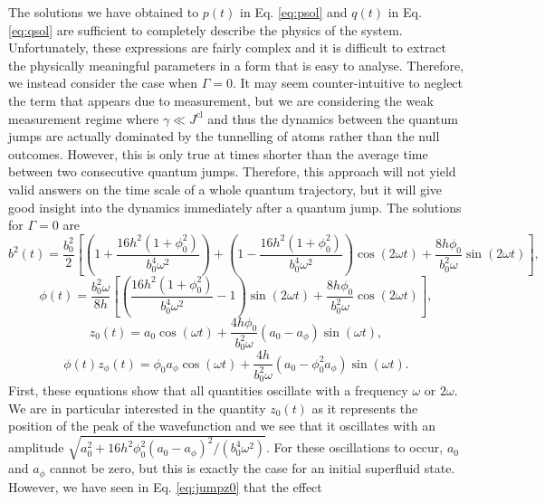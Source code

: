 The solutions we have obtained to $p(t)$ in Eq. \eqref{eq:psol} and
$q(t)$ in Eq. \eqref{eq:qsol} are sufficient to completely describe
the physics of the system. Unfortunately, these expressions are fairly
complex and it is difficult to extract the physically meaningful
parameters in a form that is easy to analyse. Therefore, we instead
consider the case when $\Gamma = 0$. It may seem counter-intuitive to
neglect the term that appears due to measurement, but we are
considering the weak measurement regime where
$\gamma \ll J^\mathrm{cl}$ and thus the dynamics between the quantum
jumps are actually dominated by the tunnelling of atoms rather than
the null outcomes. However, this is only true at times shorter than
the average time between two consecutive quantum jumps. Therefore,
this approach will not yield valid answers on the time scale of a
whole quantum trajectory, but it will give good insight into the
dynamics immediately after a quantum jump. The solutions for $\Gamma =
0$ are
\begin{equation}
b^2(t) = \frac{b_0^2}{2} \left[ \left(1 + \frac{16 h^2 (1 + \phi_0^2)}
    {b_0^4 \omega^2} \right) + \left(1 - \frac{16 h^2 (1 + \phi_0^2)}
    {b_0^4 \omega^2} \right) \cos (2 \omega t) + \frac{8 h \phi_0}{b_0^2
    \omega} \sin(2 \omega t) \right],
\end{equation}
\begin{equation}
  \phi(t) = \frac{b_0^2 \omega} {8 h} \left[ \left( \frac{16 h^2 (1 + \phi_0^2)}
      {b_0^4 \omega^2} - 1 \right) \sin (2 \omega t) + \frac{8 h
      \phi_0} {b_0^2 \omega} \cos (2 \omega t) \right],
\end{equation}
\begin{equation}
  z_0(t) = a_0 \cos(\omega t) + \frac{4 h \phi_0} {b_0^2 \omega} (a_0 -
  a_\phi) \sin (\omega t),
\end{equation}
\begin{equation}
  \phi(t) z_\phi(t) = \phi_0 a_\phi \cos (\omega t)  + \frac{4 h}
  {b_0^2 \omega} (a_0 - \phi_0^2 a_\phi) \sin( \omega t).
\end{equation}
First, these equations show that all quantities oscillate with a
frequency $\omega$ or $2 \omega$. We are in particular interested in
the quantity $z_0(t)$ as it represents the position of the peak of the
wavefunction and we see that it oscillates with an amplitude
$\sqrt{a_0^2 + 16 h^2 \phi_0^2 (a_0 - a_\phi)^2 / (b_0^4
  \omega^2)}$. For these oscillations to occur, $a_0$ and $a_\phi$
cannot be zero, but this is exactly the case for an initial superfluid
state. However, we have seen in Eq. \eqref{eq:jumpz0} that the effect
